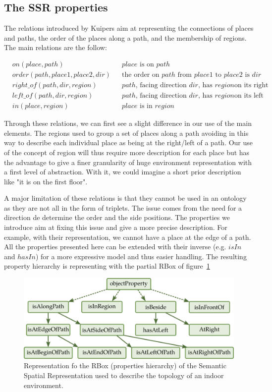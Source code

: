 \subsection{The SSR properties}

The relations introduced by Kuipers aim at representing the connections of places and paths, the order of the places along a path, and the membership of regions. The main relations are the follow:

\begin{align*}
&on(place,path) && place \text{ is on } path \\
&order(path,place1,place2,dir) && \text{the order on } path \text{ from } place1 \text{ to } place2 \text{ is } dir \\
&right\_of(path,dir,region) && path \text{, facing direction } dir \text{, has } region \text{on its right}\\
&left\_of(path,dir,region) && path \text{, facing direction } dir \text{, has } region \text{on its left} \\
&in(place,region) && place \text{ is in } region
\end{align*}

Through these relations, we can first see a slight difference in our use of the main elements. The regions used to group a set of places along a path avoiding in this way to describe each individual place as being at the right/left of a path. Our use of the concept of region will thus require more description for each place but has the advantage to give a finer granularity of huge environment representation with a first level of abstraction. With it, we could imagine a short prior description like "it is on the first floor".

A major limitation of these relations is that they cannot be used in an ontology as they are not all in the form of triplets. The issue comes from the need for a direction de determine the order and the side positions. The properties we introduce aim at fixing this issue and give a more precise description. For example, with their representation, we cannot have a place at the edge of a path. All the properties presented here can be extended with their inverse (e.g. $isIn$ and $hasIn$) for a more expressive model and thus easier handling. The resulting property hierarchy is representing with the partial RBox of figure~\ref{fig:chap3_rbox} 

\begin{figure}[ht!]
\centering
\includegraphics[scale=0.4]{figures/chapter3/ssr_rbox.png}
\caption{\label{fig:chap3_rbox} Representation fo the RBox (properties hierarchy) of the Semantic Spatial Representation used to describe the topology of an indoor environment.}
\end{figure}

